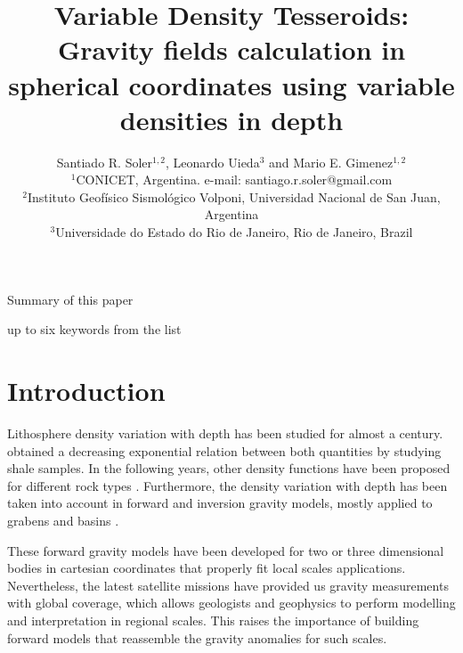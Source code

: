 \documentclass[extra]{gji}
\begin{document}
\title[Variable Density Tesseroids]{
    Variable Density Tesseroids: Gravity fields calculation in spherical coordinates using variable densities in depth
}
\author[S.R. Soler, L. Uieda and M.E. Gimenez]{
    Santiado R. Soler$^{1,2}$, Leonardo Uieda$^3$ and Mario E. Gimenez$^{1,2}$ \\
    $^1$CONICET, Argentina. e-mail: santiago.r.soler@gmail.com\\
    $^2$Instituto Geofísico Sismológico Volponi, Universidad Nacional de San Juan, Argentina\\
    $^3$Universidade do Estado do Rio de Janeiro, Rio de Janeiro, Brazil
    }


\maketitle

\begin{summary}
Summary of this paper 
\end{summary}

\begin{keywords}
up to six keywords from the list
\end{keywords}



\section{Introduction}

Lithosphere density variation with depth has been studied for almost a century. 
\citet{Athy1930} obtained a decreasing exponential relation between both quantities by studying shale samples.
In the following years, other density functions have been proposed for different rock types \citep[e.g.,][]{Maxant1980, Rao1986, Rao1993, Rao1994}.
Furthermore, the density variation with depth has been taken into account in forward and inversion gravity models, mostly applied to grabens and basins \citep{Cordell1973, Rao1986, Cowie1990, Rao1993, Rao1994, Zhang2001, Welford2010}.

These forward gravity models have been developed for two or three dimensional bodies in cartesian coordinates that properly fit local scales applications.
Nevertheless, the latest satellite missions have provided us gravity measurements with global coverage, which allows geologists and geophysics to perform modelling and interpretation in regional scales.
This raises the importance of building forward models that reassemble the gravity anomalies for such scales.
\end{document}
